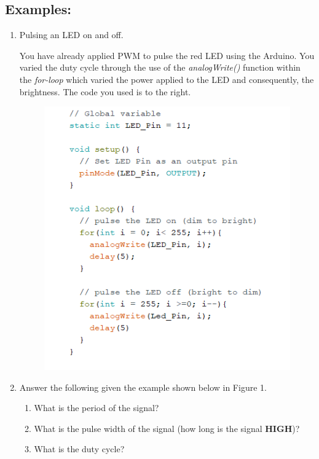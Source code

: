 \documentclass{handout}
\begin{document}
	\subsection{Examples:}
	\begin{enumerate}
		\item Pulsing an LED on and off.

	\begin{minipage}{.4\textwidth}
	You have already applied PWM to pulse the red LED using the Arduino. You varied the duty cycle through the use of the \mbox{\textit{analogWrite()}} function within the \textit{for-loop} which varied the power applied to the LED and consequently, the brightness. The code you used is to the right.
	\end{minipage}\hfill
	\begin{minipage}{.5\textwidth}
	\begin{figure} [H]
		\centering
		\includegraphics[width=\textwidth]{Figure2.PNG}
	\end{figure}
\end{minipage}
	\newpage
\clearpage
\pagebreak
	\item Answer the following given the example shown below in Figure 1.
\begin{enumerate}
	\item What is the period of the signal?
	\item What is the pulse width of the signal (how long is the signal \textbf{HIGH})?
	\item What is the duty cycle?
\end{enumerate}


\end{enumerate}
\end{document}
